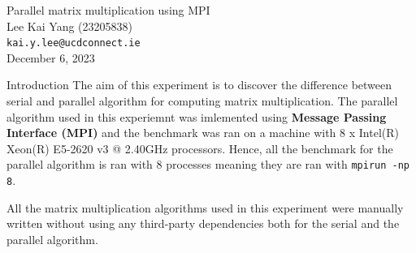 \documentclass[12pt]{article}
\begin{document}
\begin{center}
    {\LARGE Parallel matrix multiplication using MPI} \\[0.6cm]

    Lee Kai Yang (23205838) \\
    \texttt{\small kai.y.lee@ucdconnect.ie} \\[0.3cm]

    \small December 6, 2023
\end{center}

\begin{section}{Introduction}
 The aim of this experiment is to discover the difference between serial and parallel algorithm for computing matrix multiplication. The
 parallel algorithm used in this experiemnt was imlemented using \textbf{Message Passing Interface (MPI)} and the benchmark  was ran on a machine with 8 x Intel(R) Xeon(R) E5-2620 v3 @ 2.40GHz processors.
 Hence, all the benchmark for the parallel algorithm is ran with 8 processes meaning they are ran with \texttt{mpirun -np 8}.

 All the matrix multiplication algorithms used in this experiment were manually written without using any third-party dependencies both for
 the serial and the parallel algorithm.
\end{section}
\end{document}
